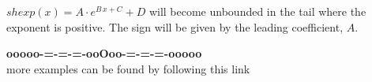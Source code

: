 \documentclass{ximera}
\begin{document}
$shexp(x) = A \cdot e^{B \, x + C} + D$ will become unbounded in the tail where the exponent is positive.  The sign will be given by the leading coefficient, $A$. \




\begin{center}
\textbf{\textcolor{green!50!black}{ooooo-=-=-=-ooOoo-=-=-=-ooooo}} \\

more examples can be found by following this link\\ 

\end{center}
\end{document}

